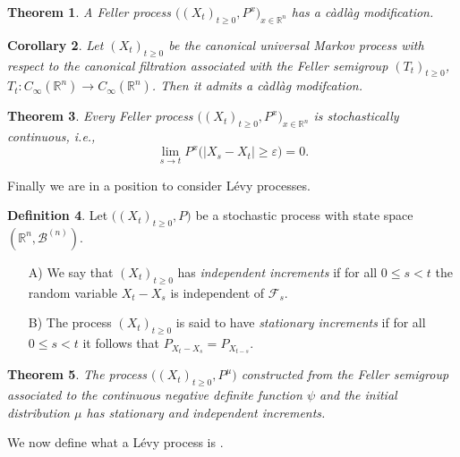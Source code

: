 \documentclass[a4paper, 12pt]{report}
\newtheorem{theorem}{Theorem}[section]
\newtheorem{corollary}[theorem]{Corollary}
\theoremstyle{remark}
\theoremstyle{definition}
\newtheorem{definition}[theorem]{Definition}
\begin{document}
\begin{theorem}
A Feller process $\big((X_t)_{t \ge 0}, P^x\big)_{x \in \mathbb{R}^n}$ has a c\`adl\`ag modification.
\end{theorem}

\begin{corollary}
Let $(X_t)_{t \ge 0}$ be the canonical universal Markov process with respect to the canonical filtration associated with the Feller semigroup $(T_t)_{t \ge 0}$, $T_t : C_\infty(\mathbb{R}^n) \to C_\infty(\mathbb{R}^n)$.  Then it admits a c\`adl\`ag modifcation.
\end{corollary}

\begin{theorem}
Every Feller process $\big((X_t)_{t \ge 0}, P^x\big)_{x \in \mathbb{R}^n}$ is stochastically continuous, i.e.,
$$
\lim_{s \to t}P^x\big(|X_s - X_t| \ge \varepsilon\big) = 0.
$$
\end{theorem}

Finally we are in a position to consider L\'evy processes.

\begin{definition}
Let $\big((X_t)_{t \ge 0}, P\big)$ be a stochastic process with state space $(\mathbb{R}^n, \mathcal{B}^{(n)})$.
\begin{itemize}
\item[A)] We say that $(X_t)_{t \ge 0}$ has \emph{independent increments} if for all $0 \le s < t$ the random variable $X_t - X_s$ is independent of $\mathcal{F}_s$.

\item[B)] The process $(X_t)_{t \ge 0}$ is said to have \emph{stationary increments} if for all $0 \le s < t$ it follows that $P_{X_t - X_s} = P_{X_{t - s}}$.
\end{itemize}
\end{definition}

\begin{theorem}\label{FAaSSPT6}
The process $\big((X_t)_{t \ge 0}, P^\mu\big)$ constructed from the Feller semigroup associated to the continuous negative definite function $\psi$ and the initial distribution $\mu$ has stationary and independent increments.
\end{theorem}

We now define what a L\'evy process is \cite{Sato}.
\end{document}
